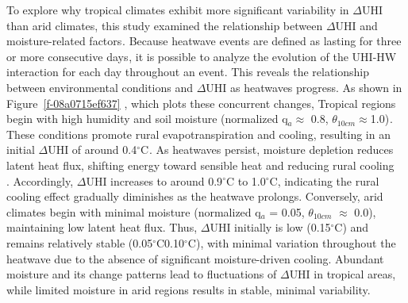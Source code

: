 \documentclass[]{nature}
\makeatletter
\renewenvironment{figure}
               {\@float{figure}}
               {\end@float}
\renewenvironment{figure*}
               {\@dblfloat{figure}}
               {\end@dblfloat}
\def\fixFloatSize#1{}%
\def\fixFloatSize#1{}
\newcommand{\texttildeapprox}{{\fontfamily{pcr}\selectfont\texttildelow}}
\makeatother
\begin{document}
\bgroup
\fixFloatSize{images/9a56a9ee-cad0-4da6-848b-7acd23fc0483-ufigure_5_box_kde_4kg_side_by_side.png}
\begin{figure*}[!htbp]
\centering \makeatletter{}
\makeatother 
\caption{{\textbf{Continental and temperate climate zones have higher UHI and heatwave interaction. Tropical regions exhibit higher variance. }Each dot represents the average \ensuremath{\Delta }UHI value for each location. The color indicates data density, with yellow indicating high density and navy blue indicating low density. Smooth curves are probability kernel density functions. Box and whiskers show means of \ensuremath{\pm}1 and \ensuremath{\pm} 3 standard deviations.}}
\label{f-449d024f9ad2}
\end{figure*}
\egroup
To explore why tropical climates exhibit more significant variability in \ensuremath{\Delta }UHI than arid climates, this study examined the relationship between \ensuremath{\Delta }UHI and moisture-related factors\ensuremath{^{}}. Because heatwave events are defined as lasting for three or more consecutive days\ensuremath{^{}}, it is possible to analyze the evolution of the UHI-HW interaction for each day throughout an event. This reveals the relationship between environmental conditions and \ensuremath{\Delta }UHI as heatwaves progress. As shown in Figure~\ref{f-08a0715ef637} , which plots these concurrent changes, Tropical regions begin with high humidity and soil moisture (normalized q\ensuremath{_{a}}\ensuremath{\approx } 0.8, \ensuremath{\theta }\ensuremath{_{10cm}}\noindent \ensuremath{\approx }1.0)\ensuremath{^{}}. These conditions promote rural evapotranspiration and cooling, resulting in an initial \ensuremath{\Delta }UHI of around 0.4\ensuremath{^\circ}C\ensuremath{^{}}. As heatwaves persist, moisture depletion reduces latent heat flux, shifting energy toward sensible heat and reducing rural cooling\unskip~\cite{2755510:33598930,2755510:33598950,2755510:33598927} . Accordingly, \ensuremath{\Delta }UHI increases to around  0.9\ensuremath{^\circ}C to 1.0\ensuremath{^\circ}C, indicating the rural cooling effect gradually diminishes as the heatwave prolongs. Conversely, arid climates begin with minimal moisture (normalized q\ensuremath{_{a}} = 0.05, \ensuremath{\theta }\ensuremath{_{10cm}} \ensuremath{\approx } 0.0), maintaining low latent heat flux. Thus, \ensuremath{\Delta }UHI initially is low ({\texttildeapprox}0.15\ensuremath{^\circ}C) and remains relatively stable (0.05\ensuremath{^\circ}C{\textendash}0.10\ensuremath{^\circ}C), with minimal variation throughout the heatwave due to the absence of significant moisture-driven cooling.  Abundant moisture and its change patterns lead to fluctuations of \ensuremath{\Delta }UHI in tropical areas, while limited moisture in arid regions results in stable, minimal variability.
\end{document}
